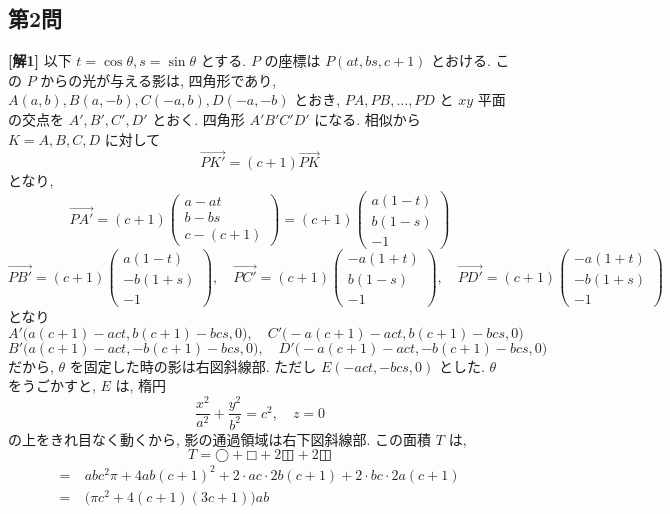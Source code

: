 \documentclass[../main.tex]{subfiles}
\begin{document}
\subsection*{第2問}

\noindent
\textbf{[解1]} 以下 $t = \cos\theta, s = \sin\theta$ とする. $P$ の座標は $P(at, bs, c+1)$ とおける. この $P$ からの光が与える影は, 四角形であり, $A(a,b), B(a,-b), C(-a,b), D(-a,-b)$ とおき, $PA, PB, \dots, PD$ と $xy$ 平面の交点を $A', B', C', D'$ とおく. 四角形 $A'B'C'D'$ になる. 相似から $K = A, B, C, D$ に対して
\[
  \vec{PK'} = (c+1)\vec{PK}
\]
となり,
\[
  \vec{PA'} = (c+1)
  \begin{pmatrix} a - at \\ b - bs \\ c - (c+1)
  \end{pmatrix} = (c+1)
  \begin{pmatrix} a(1-t) \\ b(1-s) \\ -1
  \end{pmatrix}
\]
\[
  \vec{PB'} = (c+1)
  \begin{pmatrix} a(1-t) \\ -b(1+s) \\ -1
  \end{pmatrix}, \quad \vec{PC'} = (c+1)
  \begin{pmatrix} -a(1+t) \\ b(1-s) \\ -1
  \end{pmatrix}, \quad \vec{PD'} = (c+1)
  \begin{pmatrix} -a(1+t) \\ -b(1+s) \\ -1
  \end{pmatrix}
\]
となり
\[
  A'\big( a(c+1) - act, b(c+1) - bcs, 0 \big), \quad C'\big( -a(c+1) - act, b(c+1) - bcs, 0 \big)
\]
\[
  B'\big( a(c+1) - act, -b(c+1) - bcs, 0 \big), \quad D'\big( -a(c+1) - act, -b(c+1) - bcs, 0 \big)
\]
だから, $\theta$ を固定した時の影は右図斜線部. ただし $E(-act, -bcs, 0)$ とした. $\theta$ をうごかすと, $E$ は, 楕円
\[
  \frac{x^2}{a^2} + \frac{y^2}{b^2} = c^2, \quad z=0
\]
の上をきれ目なく動くから, 影の通過領域は右下図斜線部. この面積 $T$ は,
\[
  T = \text{◯} + \text{□} + 2\text{◫} + 2\text{◫}
\]
\begin{align*}
  = & \ a b c^2 \pi + 4ab(c+1)^2 + 2 \cdot ac \cdot 2b(c+1) + 2 \cdot bc \cdot 2a(c+1) \\
  = & \ \big( \pi c^2 + 4(c+1)(3c+1) \big) a b
\end{align*}
\end{document}
